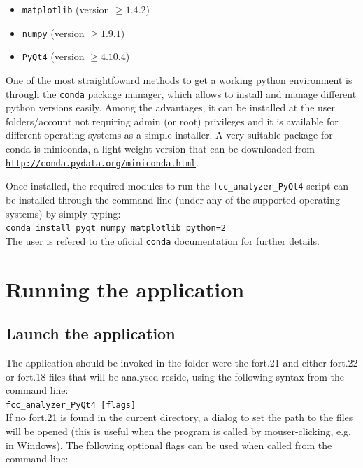 \documentclass[a4paper,11pt]{article}
\begin{document}
\begin{itemize}
 \item \texttt{matplotlib} (version $\geq1.4.2$)
 \item \texttt{numpy} (version $\geq1.9.1$)
 \item \texttt{PyQt4} (version $\geq4.10.4$)
\end{itemize}


One of the most straightfoward methods to get a working python environment is through the \href{http://conda.pydata.org/docs/intro.html}{\texttt{conda}} package manager, which allows to install and manage different python versions easily. Among the advantages, it can be installed at the user folders/account not requiring admin (or root) privileges and it is available for different operating systems as a simple installer. A very suitable package for conda is miniconda, a light-weight version that can be downloaded from \href{http://conda.pydata.org/miniconda.html}{\texttt{http://conda.pydata.org/miniconda.html}}.

Once installed, the required modules to run the \texttt{fcc\_analyzer\_PyQt4} script can be installed through the command line (under any of the supported operating systems) by simply typing:\\

\texttt{conda install pyqt numpy matplotlib python=2}\\

The user is refered to the oficial \texttt{conda} documentation for further details.


\section{Running the application}

\subsection{Launch the application}
The application should be invoked in the folder were the fort.21 and either fort.22 or fort.18 files that will be analysed reside, using the following syntax from the command line:\\

\texttt{fcc\_analyzer\_PyQt4 [flags]}\\

If no fort.21 is found in the current directory, a dialog to set the path to the files will be opened (this is useful when the program is called by mouser-clicking, e.g. in Windows). The following optional flags can be used when called from the command line:
\end{document}
